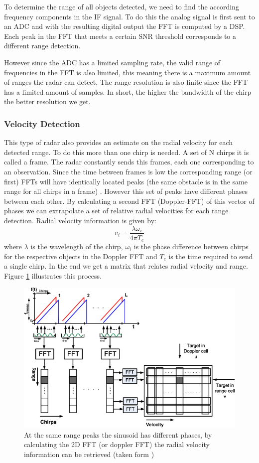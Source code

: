 To determine the range of all objects detected, we need to find the according frequency components in the \ac{IF} signal. To do this the analog signal is first sent to an \ac{ADC} and with the resulting digital output the \ac{FFT} is computed by a \ac{DSP}. Each peak in the \ac{FFT} that meets a certain \ac{SNR} threshold corresponds to a different range detection. 
 
 However since the \ac{ADC} has a limited sampling rate, the valid range of frequencies in the \ac{FFT} is also limited, this meaning there is a maximum amount of ranges the radar can detect.
The range resolution is also finite since the \ac{FFT} has a limited amount of samples. In short, the higher the bandwidth of the chirp the better resolution we get.


\subsubsection{Velocity Detection}
This type of radar also provides an estimate on the radial velocity for each detected range. To do this more than one chirp is needed. A set of N chirps it is called a frame. The radar constantly sends this frames, each one corresponding to an observation. Since the time between frames is low the corresponding range (or first) \ac{FFT}s will have  identically located peaks (the same obstacle is in the same range for all chirps in a frame) . However this set of peaks have different phases between each other. By calculating a second \ac{FFT} (Doppler-FFT) of this vector of phases we can extrapolate a set of relative radial velocities  for each range detection. Radial velocity information is given by:
\begin{equation}
    v_i=\frac{\lambda \omega_i}{4 \pi T_c}
    \label{eq:2}
\end{equation}
where $\lambda$ is the wavelength of the chirp, $\omega_i$ is the phase difference between chirps for the respective objects in the Doppler FFT and $T_c$ is the time required to send a single chirp.
In the end we get a matrix that relates radial velocity and range. 
Figure \ref{fig:matrix} illustrates this process.
\begin{figure}[ht] 
\centerline{\includegraphics [width=0.8 \textwidth]{imgs/chapter2/dopplerFFT2.png}}
\caption[2D FFT for retrieving velocity information]{At the same range peaks the sinusoid has different phases, by calculating the 2D FFT (or doppler FFT) the radial velocity information can be retrieved (taken form \cite{schroeder2010x})}
\label{fig:matrix}
\end{figure}

